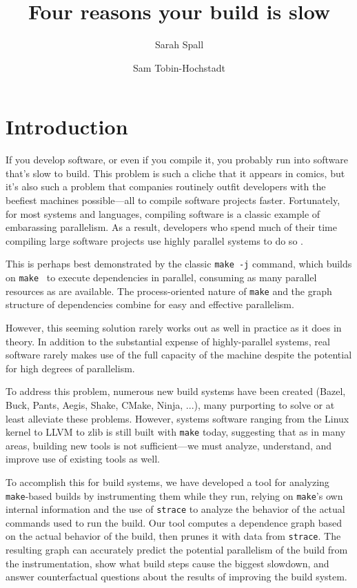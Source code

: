\documentclass[sigconf,10pt,review,authorversion]{acmart}\settopmatter{printfolios=true,printccs=false,printacmref=false}
\title{Four reasons your build is slow}
\author{Sarah Spall}
\affiliation{Indiana University}
\author{Sam Tobin-Hochstadt}
\affiliation{Indiana University}
\begin{document}
\maketitle

\section{Introduction}

If you develop software, or even if you compile it, you probably run
into software that's slow to build. This problem is such a cliche that
it appears in comics, but it's also such a problem that companies
routinely outfit developers with the beefiest machines possible---all
to compile software projects faster. Fortunately, for most systems and
languages, compiling software is a classic example of embarassing
parallelism. As a result, developers who spend much of their time
compiling large software projects use highly parallel systems to do so
\cite{regehr-tweet}.

This is perhaps best demonstrated by the classic \verb|make -j|
command, which builds on \verb|make|~\cite{make} to execute
dependencies in parallel, consuming as many parallel resources as are
available. The process-oriented nature of \verb|make| and the graph
structure of dependencies combine for easy and effective parallelism.

However, this seeming solution rarely works out as well in practice as
it does in theory. In addition to the substantial expense of
highly-parallel systems, real software rarely makes use of the full
capacity of the machine despite the potential for high
degrees of parallelism.

To address this problem, numerous new build systems have been created
(Bazel, Buck, Pants, Aegis, Shake, CMake, Ninja, ...), many purporting
to solve or at least alleviate these problems. However, systems
software ranging from the Linux kernel to LLVM to zlib is still built
with \verb|make| today, suggesting that as in many areas, building new
tools is not sufficient---we must analyze, understand, and improve use
of existing tools as well.

To accomplish this for build systems, we have developed a tool for
analyzing \verb|make|-based builds by instrumenting them while they
run, relying on \verb|make|'s own internal information and the use of
\verb|strace| to analyze the behavior of the actual commands used to
run the build. Our tool computes a dependence graph based on the
actual behavior of the build, then prunes it with data from
\verb|strace|. The resulting graph can accurately predict the
potential parallelism of the build from the instrumentation, show what
build steps cause the biggest slowdown, and answer counterfactual
questions about the results of improving the build system.
\end{document}
